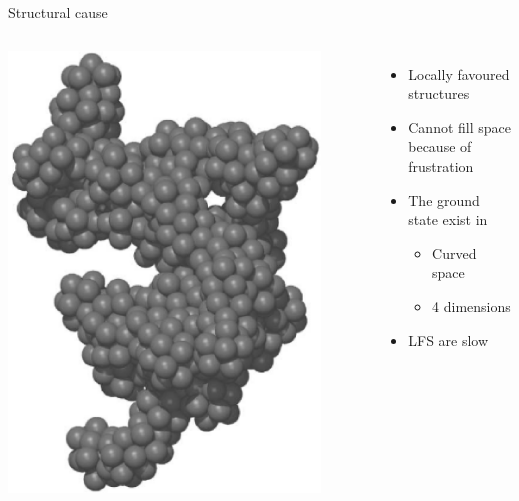 \begin{frame}{Structural cause}
	\begin{columns}
	\includegraphics[width=\columnwidth]{Dzugutov_LFS}\\
	\begin{footnotesize}\citet{Dzugutov2002}\end{footnotesize}
	\citet{tarjus2005fba}
	\begin{itemize}
		\item Locally favoured structures
		\item Cannot fill space because of \alert{frustration}
		\item The ground state exist in
		\begin{itemize}
			\item Curved space
			\item 4 dimensions
		\end{itemize}
		\item LFS are slow		
	\end{itemize}
	\end{columns}
\end{frame}

